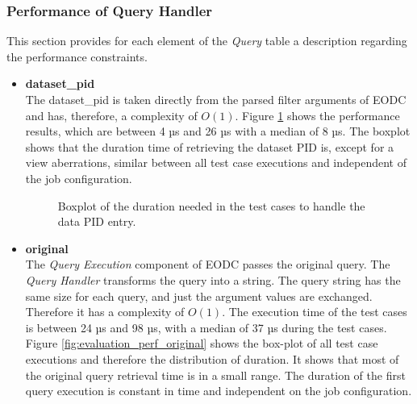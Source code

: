 \documentclass[draft,final]{vutinfth} %
\begin{document}
\subsubsection{Performance of Query Handler}\label{Evaluation:impact_perf_query}
This section provides for each element of the \textit{Query} table a description regarding the performance constraints.

\begin{itemize}
	\item \textbf{dataset\_pid} \\
	The dataset\_pid is taken directly from the parsed filter arguments of EODC and has, therefore, a complexity of $O(1)$. Figure \ref{fig:evaluation_perf_datapid} shows the performance results, which are between 4 µs and 26 µs with a median of 8 µs. The boxplot shows that the duration time of retrieving the dataset PID is, except for a view aberrations, similar between all test case executions and independent of the job configuration.
	\begin{figure}[!h]
		\centering
		\caption{Boxplot of the duration needed in the test cases to handle the data PID entry. }
		\label{fig:evaluation_perf_datapid}
	\end{figure}
	\item \textbf{original} \\
	The \textit{Query Execution} component of EODC passes the original query. The \textit{Query Handler} transforms the query into a string. The query string has the same size for each query, and just the argument values are exchanged. Therefore it has a complexity of $O(1)$. The execution time of the test cases is between 24 µs and 98 µs, with a median of 37 µs during the test cases. Figure \ref{fig:evaluation_perf_original} shows the box-plot of all test case executions and therefore the distribution of duration. It shows that most of the original query retrieval time is in a small range. The duration of the first query execution is constant in time and independent on the job configuration. 
	\begin{figure}[!h]

\end{figure}
\end{itemize}
\end{document}

